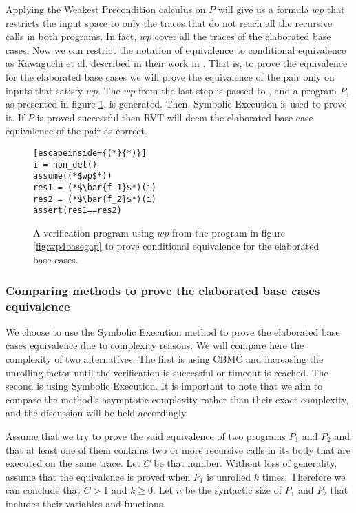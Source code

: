 Applying the Weakest Precondition calculus on $P$ will give us a formula $wp$ that restricts the input space to only the traces that do not reach all the recursive calls in both programs. In fact, $wp$ cover all the traces of the elaborated base cases. 
Now we can restrict the notation of equivalence to conditional equivalence as Kawaguchi et al. described in their work in \cite{kawaguchi2010conditional}. That is, to prove the equivalence for the elaborated base cases we will prove the equivalence of the pair only on inputs that satisfy $wp$. The $wp$ from the last step is passed to , and a program $P$, as presented in figure \ref{fig:basegapvefprogram}, is generated. Then, Symbolic Execution is used to prove it. If $P$ is proved successful then RVT will deem the elaborated base case equivalence of the pair as correct. 
\begin{figure} [h]
\begin{center}
\begin{minipage}{7 cm}
\begin{lstlisting}[escapeinside={(*}{*)}]
i = non_det()
assume((*$wp$*))
res1 = (*$\bar{f_1}$*)(i)
res2 = (*$\bar{f_2}$*)(i)
assert(res1==res2)
\end{lstlisting}
\end{minipage}
\caption{A verification program using $wp$ from the program in figure \ref{fig:wp4basegap} to prove conditional equivalence for the elaborated base cases.}
\label{fig:basegapvefprogram}
\end{center}
\end{figure}

\subsubsection{Comparing methods to prove the elaborated base cases equivalence}
We choose to use the Symbolic Execution method to prove the elaborated base cases equivalence due to complexity reasons. We will compare here the complexity of two alternatives. The first is using CBMC and increasing the unrolling factor until the verification is successful or timeout is reached. The second is using Symbolic Execution. It is important to note that we aim to compare the method's asymptotic complexity rather than their exact complexity, and the discussion will be held accordingly.  

Assume that we try to prove the said equivalence of two programs $P_1$ and $P_2$ and that at least one of them contains two or more recursive calls in its body that are executed on the same trace. Let $C$ be that number. Without loss of generality, assume that the equivalence is proved when $P_1$ is unrolled $k$ times. Therefore we can conclude that $C > 1$ and $k \geq 0$. Let $n$ be the syntactic size of $P_1$ and $P_2$ that includes their variables and functions. 

